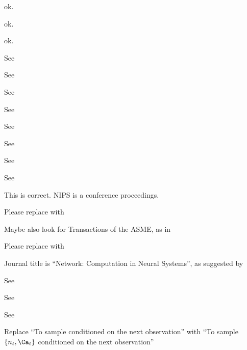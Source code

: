 \ena
\item ok.
\item ok.
\item ok.
\item See \cite{YusteKonnerth06}
\item See \cite{TayYue07}
\item See \cite{YasudaSvoboda04}
\item See \cite{BorstAbarbanel07}
\item See \cite{SasakiIkegaya08}
\item See \cite{DoucetGordon01}
\item See \cite{DempsterRubin77}
\item See \cite{SamejimaKimura04}
\item This is correct.  NIPS is a conference proceedings.
\item Please replace with \cite{HuysPaninski09}
\item Maybe also look for Transactions of the ASME, as in \cite{Kalman60}
\item Please replace with \cite{HuysPaninski09}
\item Journal title is ``Network: Computation in Neural Systems'', as suggested by \cite{Paninski04}
\item See \cite{VogelsteinPaninski09a}  
\item See \cite{PillowSimoncelli08}
\item See \cite{ShumwayStoffer06}
\item Replace ``To sample conditioned on the next observation'' with ``To sample $\{n_t, \Ca_t\}$ conditioned on the next observation''
\enb


\clearpage \newpage


%



